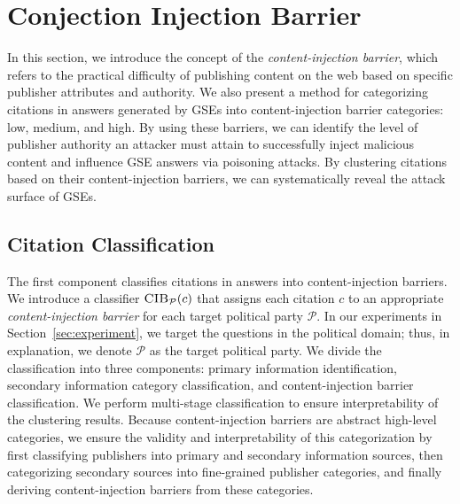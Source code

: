 \section{Conjection Injection Barrier}
\label{sec:methodology}




In this section, we introduce the concept of the \emph{content-injection barrier}, which refers to the practical difficulty of publishing content on the web based on specific publisher attributes and authority. We also present a method for categorizing citations in answers generated by GSEs into content-injection barrier categories: low, medium, and high.
By using these barriers, we can identify the level of publisher authority an attacker must attain to successfully inject malicious content and influence GSE answers via poisoning attacks.
By clustering citations based on their content-injection barriers, we can systematically reveal the attack surface of GSEs.


\subsection{Citation Classification}
\label{subsec:citation_classification}
The first component classifies citations in answers into content-injection barriers.
We introduce a classifier $\textsc{CIB}_{\mathcal{P}}(c)$ that assigns each citation $c$ to an appropriate \emph{content-injection barrier} for each target political party $\mathcal{P}$.
In our experiments in Section~\ref{sec:experiment}, we target the questions in the political domain; thus, in explanation, we denote $\mathcal{P}$ as the target political party.
We divide the classification into three components: primary information identification, secondary information category classification, and content-injection barrier classification.
We perform multi-stage classification to ensure interpretability of the clustering results.
Because content-injection barriers are abstract high-level categories, we ensure the validity and interpretability of this categorization by first classifying publishers into primary and secondary information sources, then categorizing secondary sources into fine-grained publisher categories, and finally deriving content-injection barriers from these categories.

